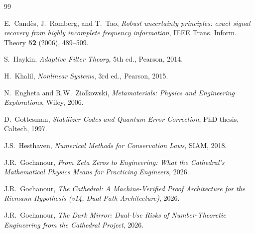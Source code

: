 \documentclass[11pt,a4paper]{article}
\begin{document}
\begin{thebibliography}{99}

E.~Cand\`es, J.~Romberg, and T.~Tao, \emph{Robust uncertainty
principles: exact signal recovery from highly incomplete frequency
information}, IEEE Trans. Inform. Theory \textbf{52} (2006), 489--509.

S.~Haykin, \emph{Adaptive Filter Theory}, 5th ed., Pearson, 2014.

H.~Khalil, \emph{Nonlinear Systems}, 3rd ed., Pearson, 2015.

N.~Engheta and R.W.~Ziolkowski, \emph{Metamaterials: Physics and
Engineering Explorations}, Wiley, 2006.

D.~Gottesman, \emph{Stabilizer Codes and Quantum Error Correction},
PhD thesis, Caltech, 1997.

J.S.~Hesthaven, \emph{Numerical Methods for Conservation Laws},
SIAM, 2018.

J.R.~Gochanour, \emph{From Zeta Zeros to Engineering: What the
Cathedral's Mathematical Physics Means for Practicing Engineers},
2026.

J.R.~Gochanour, \emph{The Cathedral: A Machine-Verified Proof
Architecture for the Riemann Hypothesis (v14, Dual Path
Architecture)}, 2026.

J.R.~Gochanour, \emph{The Dark Mirror: Dual-Use Risks of
Number-Theoretic Engineering from the Cathedral Project}, 2026.

\end{thebibliography}
\end{document}
